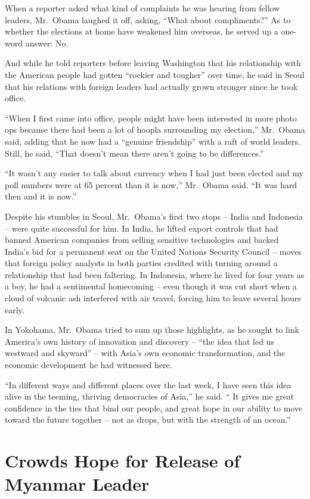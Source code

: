 ﻿\documentclass[12pt]{article}
\begin{document}
When a reporter asked what kind of complaints he was hearing from fellow leaders, Mr.~Obama laughed
it off, asking, ``What about compliments?'' As to whether the elections at home have weakened him
overseas, he served up a one-word answer: No.

And while he told reporters before leaving Washington that his relationship with the American people
had gotten ``rockier and tougher'' over time, he said in Seoul that his relations with foreign
leaders had actually grown stronger since he took office.

``When I first came into office, people might have been interested in more photo ops because there
had been a lot of hoopla surrounding my election,'' Mr.~Obama said, adding that he now had a
``genuine friendship'' with a raft of world leaders. Still, he said, ``That doesn't mean there
aren't going to be differences.''

``It wasn't any easier to talk about currency when I had just been elected and my poll numbers were
at 65 percent than it is now,'' Mr.~Obama said. ``It was hard then and it is now.''

Despite his stumbles in Seoul, Mr.~Obama's first two stops -- India and Indonesia -- were quite
successful for him. In India, he lifted export controls that had banned American companies from
selling sensitive technologies and backed India's bid for a permanent seat on the United Nations
Security Council -- moves that foreign policy analysts in both parties credited with turning around
a relationship that had been faltering. In Indonesia, where he lived for four years as a boy, he had
a sentimental homecoming -- even though it was cut short when a cloud of volcanic ash interfered
with air travel, forcing him to leave several hours early.

In Yokohama, Mr.~Obama tried to sum up those highlights, as he sought to link America's own history
of innovation and discovery -- ``the idea that led us westward and skyward'' -- with Asia's own
economic transformation, and the economic development he had witnessed here.

``In different ways and different places over the last week, I have seen this idea alive in the
teeming, thriving democracies of Asia,'' he said. `` It gives me great confidence in the ties that
bind our people, and great hope in our ability to move toward the future together -- not as drops,
but with the strength of an ocean.''

\section{Crowds Hope for Release of Myanmar Leader}
\end{document}
